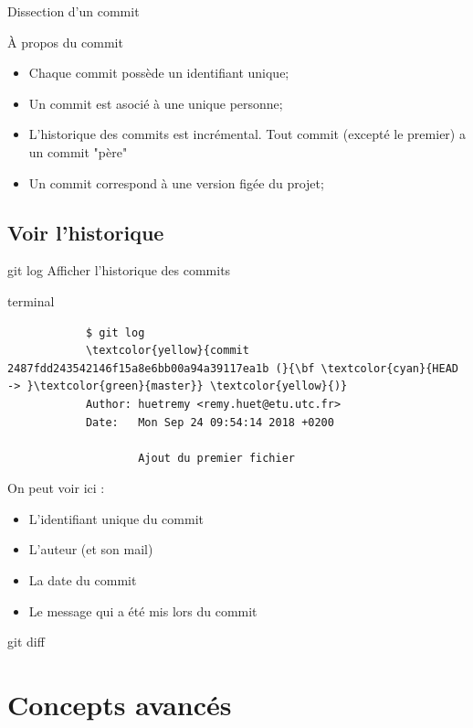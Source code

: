 \documentclass[usepdftitle=false]{beamer}
\def\seplength{.5\topsep}
\newcommand{\Pause}{%
\ifdef{\Release}
  {\pause}
  {}
}
\begin{document}
\begin{frame}{Dissection d'un commit}
	\begin{block}{À propos du commit}
		\begin{itemize}
			\item Chaque commit possède un identifiant unique;
			\item Un commit est asocié à une unique personne;
			\item L'historique des commits est incrémental. Tout commit (excepté le premier) a un commit "père"
			\item Un commit correspond à une version figée du projet;
		\end{itemize}
	\end{block}
\end{frame}

\subsection{Voir l'historique}

\begin{frame}[fragile]{git log}
	Afficher l'historique des commits
	\begin{beamercolorbox}[rounded=true,shadow=true]{terminal}
		\vspace{-\seplength}
		\begin{Verbatim}
			$ git log
			\textcolor{yellow}{commit 2487fdd243542146f15a8e6bb00a94a39117ea1b (}{\bf \textcolor{cyan}{HEAD -> }\textcolor{green}{master}} \textcolor{yellow}{)}
			Author: huetremy <remy.huet@etu.utc.fr>
			Date:   Mon Sep 24 09:54:14 2018 +0200

    				Ajout du premier fichier
		\end{Verbatim}
	\end{beamercolorbox}
	\Pause
	On peut voir ici : \Pause
	\begin{itemize}
		\item L'identifiant unique du commit \Pause
		\item L'auteur (et son mail) \Pause
		\item La date du commit \Pause
		\item Le message qui a été mis lors du commit
	\end{itemize}
\end{frame}

\begin{frame}{git diff}
\end{frame}

\section{Concepts avancés}
\end{document}
